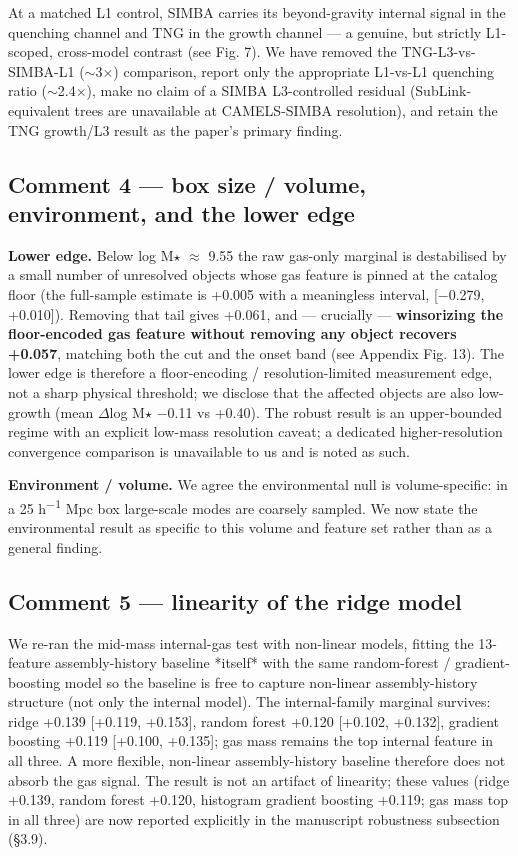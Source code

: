 \documentclass[11pt]{article}
\begin{document}
At a matched L1 control, SIMBA carries its beyond-gravity internal signal in the quenching channel and TNG in the growth channel --- a genuine, but strictly L1-scoped, cross-model contrast (see Fig. 7). We have removed the TNG-L3-vs-SIMBA-L1 ($\sim$3$\times$) comparison, report only the appropriate L1-vs-L1 quenching ratio ($\sim$2.4$\times$), make no claim of a SIMBA L3-controlled residual (SubLink-equivalent trees are unavailable at CAMELS-SIMBA resolution), and retain the TNG growth/L3 result as the paper's primary finding.

\subsection*{Comment 4 --- box size / volume, environment, and the lower edge}
\textbf{Lower edge.} Below log M$\star$ $\approx$ 9.55 the raw gas-only marginal is destabilised by a small number of unresolved objects whose gas feature is pinned at the catalog floor (the full-sample estimate is +0.005 with a meaningless interval, [$-$0.279, +0.010]). Removing that tail gives +0.061, and --- crucially --- \textbf{winsorizing the floor-encoded gas feature without removing any object recovers +0.057}, matching both the cut and the onset band (see Appendix Fig. 13). The lower edge is therefore a floor-encoding / resolution-limited measurement edge, not a sharp physical threshold; we disclose that the affected objects are also low-growth (mean $\Delta$log M$\star$ $-$0.11 vs +0.40). The robust result is an upper-bounded regime with an explicit low-mass resolution caveat; a dedicated higher-resolution convergence comparison is unavailable to us and is noted as such.

\textbf{Environment / volume.} We agree the environmental null is volume-specific: in a 25 h\textsuperscript{$-1$} Mpc box large-scale modes are coarsely sampled. We now state the environmental result as specific to this volume and feature set rather than as a general finding.

\subsection*{Comment 5 --- linearity of the ridge model}
We re-ran the mid-mass internal-gas test with non-linear models, fitting the 13-feature assembly-history baseline *itself* with the same random-forest / gradient-boosting model so the baseline is free to capture non-linear assembly-history structure (not only the internal model). The internal-family marginal survives: ridge +0.139 [+0.119, +0.153], random forest +0.120 [+0.102, +0.132], gradient boosting +0.119 [+0.100, +0.135]; gas mass remains the top internal feature in all three. A more flexible, non-linear assembly-history baseline therefore does not absorb the gas signal. The result is not an artifact of linearity; these values (ridge +0.139, random forest +0.120, histogram gradient boosting +0.119; gas mass top in all three) are now reported explicitly in the manuscript robustness subsection (\S{}3.9).
\end{document}
